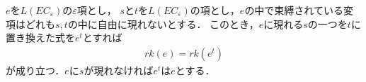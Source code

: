 	\begin{comment}
	実際に$L(EC_{\varepsilon})$の全ての$\varepsilon$項に対して階数が定まっている．
	(構造的帰納法について準備不足だが，直感的に次の説明は妥当である...)
	\begin{description}
		\item[step1] $e$が$L(EC)$の式で作られた$\varepsilon$項ならば$e$の階数は$1$である．
		
		\item[step3] 項$\tau_{1},\cdots,\tau_{n}$のそれぞれに対して，
			その全ての部分$\varepsilon$項に階数が定まっていれば，
			$f$を$n$項関数として，$f\tau_{1}\cdots\tau_{n}$の階数は
			$rk(\tau_{1}),\cdots,rk(\tau_{n})$の中の最大値である．
			というのも，$f\tau_{1}\cdots\tau_{n}$に現れる$\varepsilon$項は
			$\tau_{1},\cdots,\tau_{n}$のいずれかの部分項になっているためである．
			
		\item[step4] 項$\tau_{1},\cdots,\tau_{n}$のそれぞれに対して，
			その全ての部分$\varepsilon$項に階数が定まっていれば，
			$p$を$n$項述語として，$p\tau_{1}\cdots\tau_{n}$の階数は
			$rk(\tau_{1}),\cdots,rk(\tau_{n})$の中の最大値である．
		
		\item[step5] 式$\varphi$と$\psi$のそれぞれに対して，
			その全ての部分$\varepsilon$項に階数が定まっていれば，
			\begin{align}
				rk(\rightharpoondown \varphi) &\coloneqq rk(\varphi), \\
				rk(\vee \varphi \psi) &\coloneqq \max\{rk(\varphi),rk(\psi)\}, \\
				rk(\wedge \varphi \psi) &\coloneqq \max\{rk(\varphi),rk(\psi)\}, \\
				rk(\Longrightarrow \varphi \psi) 
				&\coloneqq \max\{rk(\varphi),rk(\psi)\}, \\
			\end{align}
			である．というのも，左辺の式に現れる$\varepsilon$項は
			$\varphi$か$\psi$の少なくとも一方に現れているからである．
		
		\item[step2] $e$に従属している全ての$\varepsilon$項に対して階数が定まっているならば，
			$e$の階数は定義通りに定めることが出来る．
	\end{description}
	\end{comment}
	
	\begin{screen}
		\begin{metathm}[階数定理]
			$e$を$L(EC_{\varepsilon})$の$\varepsilon$項とし，
			$s$と$t$を$L(EC_{\varepsilon})$の項とし，$e$の中で束縛されている変項はどれも$s,t$の中に自由に現れないとする．
			このとき，$e$に現れる$s$の一つを$t$に置き換えた式を$e^{t}$とすれば
			\begin{align}
				rk(e) = rk(e^{t})
			\end{align}
			が成り立つ．$e$に$s$が現れなければ$e^{t}$は$e$とする．
		\end{metathm}
	\end{screen}
	
